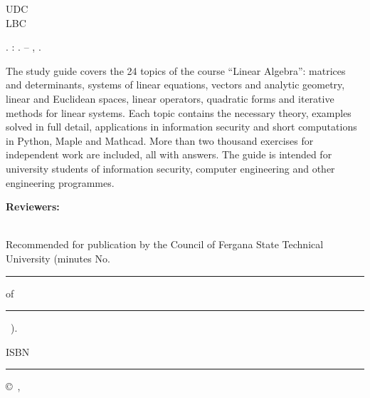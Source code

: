 \thispagestyle{empty}
\noindent UDC \UOK\\
LBC \KBK

\bigskip
\noindent\MuallifQisqa. \KitobNomi: \KitobTuri. – \Shahar, \Yil.

\bigskip
\noindent\small
The study guide covers the 24 topics of the course “Linear Algebra”: matrices
and determinants, systems of linear equations, vectors and analytic
geometry, linear and Euclidean spaces, linear operators, quadratic forms
and iterative methods for linear systems. Each topic contains the necessary
theory, examples solved in full detail, applications in information
security and short computations in Python, Maple and Mathcad. More than
two thousand exercises for independent work are included, all with
answers. The guide is intended for university students of information
security, computer engineering and other engineering programmes.
\normalsize

\vfill
\noindent\textbf{Reviewers:}\\
\TaqrizchiBir\\
\TaqrizchiIkki

\bigskip
\noindent\small
Recommended for publication by the Council of Fergana State Technical
University (minutes No.~\rule{0.8cm}{0.4pt} of \rule{1.2cm}{0.4pt}~\Yil).
\normalsize

\bigskip
\noindent ISBN \rule{3cm}{0.4pt} \hfill \copyright~\MuallifQisqa, \Yil
\clearpage
